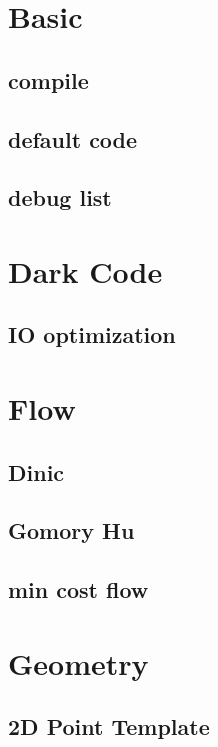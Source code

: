 \section{Basic}

\subsection{compile}

\subsection{default code}

\subsection{debug list}


\section{Dark Code}

\subsection{IO optimization}



\section{Flow}

\subsection{Dinic}

\subsection{Gomory Hu}

\subsection{min cost flow}


\section{Geometry}

\subsection{2D Point Template}

